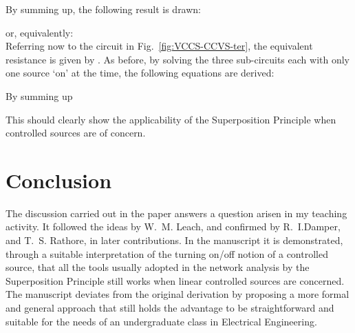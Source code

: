 \documentclass[10pt]{amsart}
\begin{document}
By summing up, the following result is drawn:

or, equivalently: \\

Referring now to the circuit in Fig.~\ref{fig:VCCS-CCVS-ter}, the equivalent resistance is given by . As before, by solving the three sub-circuits each with only one source `on' at the time, the following equations are derived:



By summing up

This should clearly show the applicability of the Superposition Principle when controlled sources are of concern.

\section{Conclusion}
The discussion carried out in the paper answers a question arisen in my teaching activity. It followed the ideas by W.~M. Leach, \cite{M-L-94} and confirmed by R.~I.Damper, \cite{Damper_11} and  T.~S. Rathore, \cite{Rathore_12} in later contributions. In the manuscript it is demonstrated, through a suitable interpretation of the turning on/off notion of a controlled source, that all the tools usually adopted in the network analysis by the Superposition Principle still works when linear controlled sources are concerned. The manuscript deviates from the original derivation by proposing a more formal and general approach that still holds the advantage to be straightforward and suitable for the needs of an undergraduate class in Electrical Engineering.
\end{document}
